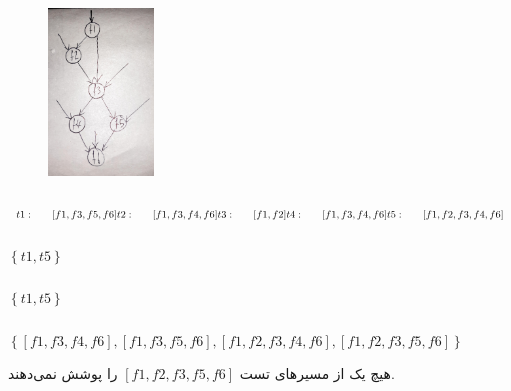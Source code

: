 \documentclass{article}
\begin{document}
\subsubsection{}
\begin{figure}[H]
    \centering
    \includegraphics[width=0.25\textwidth]{figures/swt3.jpg}
    \caption
	{}
    \label{fig:fig1}
\end{figure}
\subsubsection{}
\begin{latin}
$
t1:\:\:\:\:\:\:\:\: [f1, f3, f5, f6]\\
t2:\:\:\:\:\:\:\:\: [f1, f3, f4, f6]\\
t3:\:\:\:\:\:\:\:\: [f1, f2]\\
t4:\:\:\:\:\:\:\:\: [f1, f3, f4, f6]\\
t5:\:\:\:\:\:\:\:\: [f1, f2, f3, f4, f6]\\
$
\end{latin}

\subsubsection{}
\begin{latin}
$
\left\{ t1, t5\right\}
$
\end{latin}

\subsubsection{}
\begin{latin}
$
\left\{ t1, t5\right\}
$
\end{latin}

\subsubsection{}
\begin{latin}
$
\left\{[f1, f3, f4, f6], [f1, f3, f5, f6], [f1, f2, f3, f4, f6], [f1, f2, f3, f5, f6]\right\}
$
\end{latin}
هیچ یک از مسیرهای تست $[f1, f2, f3, f5, f6]$ را پوشش نمی‌دهند.
\end{document}
